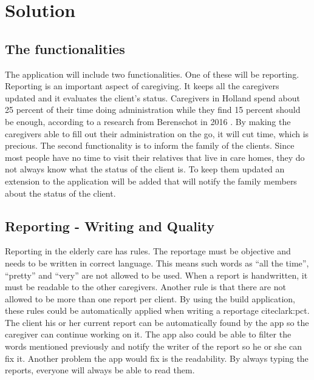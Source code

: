 \documentclass[12pt, a4paper]{article}
\begin{document}
\newpage


\section{Solution}

\subsection{The functionalities}
The application will include two functionalities. One of these will be reporting. Reporting is an important aspect of caregiving. It keeps all the caregivers updated and it evaluates the client’s status. Caregivers in Holland spend about 25 percent of their time doing administration while they find 15 percent should be enough, according to a research from Berenschot in 2016 \cite{salas:calculus}. By making the caregivers able to fill out their administration on the go, it will cut time, which is precious.
The second functionality is to inform the family of the clients. Since most people have no time to visit their relatives that live in care homes, they do not always know what the status of the client is. To keep them updated an extension to the application will be added that will notify the family members about the status of the client.

\subsection{Reporting - Writing and Quality}
Reporting in the elderly care has rules. The reportage must be objective and needs to be written in correct language. This means such words as “all the time”, “pretty” and “very” are not allowed to be used. When a report is handwritten, it must be readable to the other caregivers. Another rule is that there are not allowed to be more than one report per client. By using the build application, these rules could be automatically applied when writing a reportage cite{clark:pct}. The client his or her current report can be automatically found by the app so the caregiver can continue working on it. The app also could be able to filter the words mentioned previously and notify the writer of the report so he or she can fix it. Another problem the app would fix is the readability. By always typing the reports, everyone will always be able to read them.
\end{document}
